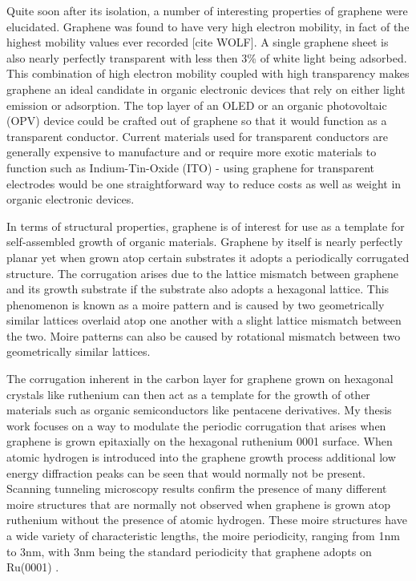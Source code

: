 Quite soon after its isolation, a number of interesting properties of graphene were elucidated. Graphene was found to have very high electron mobility, in fact of the highest mobility values ever recorded [cite WOLF]. A single graphene sheet is also nearly perfectly transparent with less then 3{\%} of white light being adsorbed. This combination of high electron mobility coupled with high transparency makes graphene an ideal candidate in organic electronic devices that rely on either light emission or adsorption. The top layer of an OLED or an organic photovoltaic (OPV) device could be crafted out of graphene so that it would function as a transparent conductor. Current materials used for transparent conductors are generally expensive to manufacture and or require more exotic materials to function such as Indium-Tin-Oxide (ITO) - using graphene for transparent electrodes would be one straightforward way to reduce costs as well as weight in organic electronic devices.

In terms of structural properties, graphene is of interest for use as a template for self-assembled growth of organic materials. Graphene by itself is nearly perfectly planar yet when grown atop certain substrates it adopts a periodically corrugated structure. The corrugation arises due to the lattice mismatch between graphene and its growth substrate if the substrate also adopts a hexagonal lattice. This phenomenon is known as a moire pattern and is caused by two geometrically similar lattices overlaid atop one another with a slight lattice mismatch between the two. Moire patterns can also be caused by rotational mismatch between two geometrically similar lattices. 

The corrugation inherent in the carbon layer for graphene grown on hexagonal crystals like ruthenium can then act as a template for the growth of other materials such as organic semiconductors like pentacene derivatives. My thesis work focuses on a way to modulate the periodic corrugation that arises when graphene is grown epitaxially on the hexagonal ruthenium 0001 surface. When atomic hydrogen is introduced into the graphene growth process additional low energy diffraction peaks can be seen that would normally not be present. Scanning tunneling microscopy results confirm the presence of many different moire structures that are normally not observed when graphene is grown atop ruthenium without the presence of atomic hydrogen. These moire structures have a wide variety of characteristic lengths, the moire periodicity, ranging from 1nm to 3nm, with 3nm being the standard periodicity that graphene adopts on Ru(0001) \cite{march}.

